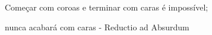\documentclass[preview]{standalone}
\begin{document}
\begin{center}
Começar com coroas e terminar com caras é impossível;

         nunca acabará com caras - Reductio ad Absurdum
\end{center}
\end{document}
